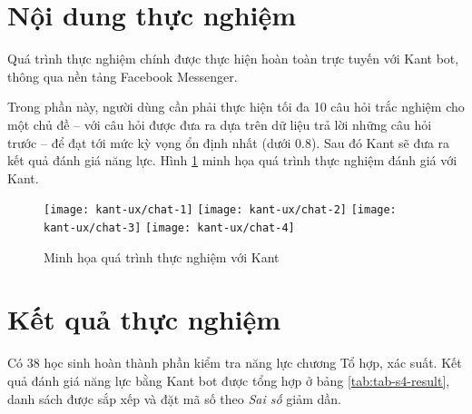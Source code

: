 \section{Nội dung thực nghiệm}
Quá trình thực nghiệm chính được thực hiện hoàn toàn trực tuyến với Kant bot, thông qua nền tảng Facebook Messenger.\par
Trong phần này, người dùng cần phải thực hiện tối đa 10 câu hỏi trắc nghiệm\cite{le2015xay} cho một chủ đề – với câu hỏi được đưa ra dựa trên dữ liệu trả lời những câu hỏi trước – để đạt tới mức kỳ vọng ổn định nhất (dưới $0.8$). Sau đó Kant sẽ đưa ra kết quả đánh giá năng lực. Hình \ref{fig:fig-c4-chatbot-demo} minh họa quá trình thực nghiệm đánh giá với Kant.
\begin{figure}[htb!]\centering
	\texttt{[image: kant-ux/chat-1]}
	\texttt{[image: kant-ux/chat-2]}
	\texttt{[image: kant-ux/chat-3]}
	\texttt{[image: kant-ux/chat-4]}
	\caption{Minh họa quá trình thực nghiệm với Kant}
	\label{fig:fig-c4-chatbot-demo}
\end{figure}\par

\section{Kết quả thực nghiệm}

Có 38 học sinh hoàn thành phần kiểm tra năng lực chương Tổ hợp, xác suất. Kết quả đánh giá năng lực bằng Kant bot được tổng hợp ở bảng \ref{tab:tab-s4-result}, danh sách được sắp xếp và đặt mã số theo \textit{Sai số} giảm dần.

